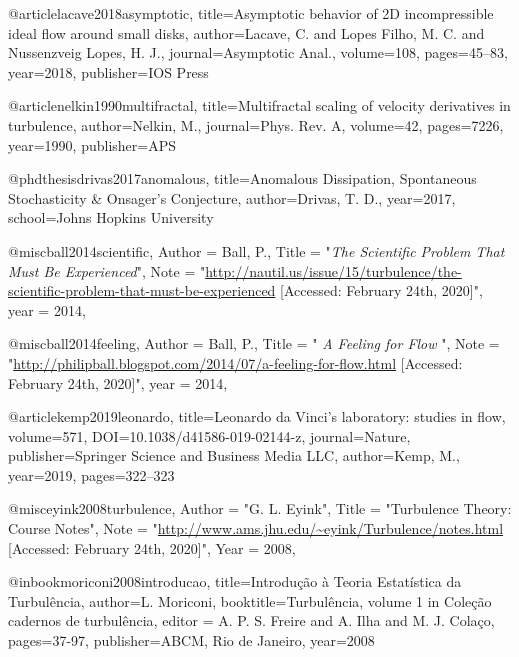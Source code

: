   @article{lacave2018asymptotic,
    title={{Asymptotic behavior of 2D incompressible ideal flow around small disks}},
    author={Lacave, C. and Lopes Filho, M. C. and Nussenzveig Lopes, H. J.},
    journal={Asymptotic Anal.},
    volume={108},
    pages={45--83},
    year={2018},
    publisher={IOS Press}
  }

  @article{nelkin1990multifractal,
    title={{Multifractal scaling of velocity derivatives in turbulence}},
    author={Nelkin, M.},
    journal={Phys. Rev. A},
    volume={42},
    pages={7226},
    year={1990},
    publisher={APS}
  }

  @phdthesis{drivas2017anomalous,
    title={{Anomalous Dissipation, Spontaneous Stochasticity \& Onsager's Conjecture}},
    author={Drivas, T. D.},
    year={2017},
    school={Johns Hopkins University}
  }





  @misc{ball2014scientific,
    Author = {Ball, P.},
    Title  = "\emph{The Scientific Problem That Must Be Experienced}",
    Note   = "\url{http://nautil.us/issue/15/turbulence/the-scientific-problem-that-must-be-experienced} [Accessed: February 24th, 2020]",
    year = 2014,
  }

  @misc{ball2014feeling,
    Author = {Ball, P.},
    Title  = "\emph{ A Feeling for Flow }",
    Note   = "\url{http://philipball.blogspot.com/2014/07/a-feeling-for-flow.html}
             [Accessed: February 24th, 2020]",
    year = 2014,
  }

  @article{kemp2019leonardo,
   title={{Leonardo da Vinci’s laboratory: studies in flow}},
   volume={571},
   DOI={10.1038/d41586-019-02144-z},
   journal={Nature},
   publisher={Springer Science and Business Media LLC},
   author={Kemp, M.},
   year={2019},
   pages={322–323}
   }


  @misc{eyink2008turbulence,
    Author = "G. L. Eyink",
    Title  = "Turbulence Theory: Course Notes",
    Note   = "\url{http://www.ams.jhu.edu/~eyink/Turbulence/notes.html}
             [Accessed: February 24th, 2020]",
    Year   = 2008,
  }

  @inbook{moriconi2008introducao,
    title={{Introdução \`{a} Teoria Estat\'{i}stica da Turbul\^{e}ncia}},
    author={L. Moriconi},
    booktitle={Turbul\^{e}ncia, volume 1 in Cole\c c\~{a}o cadernos de turbul\^{e}ncia},
    editor = {A. P. S. Freire and A. Ilha and M. J. Cola\c co},
    pages={37-97},
    publisher={ABCM, Rio de Janeiro},
    year={2008}
  }

